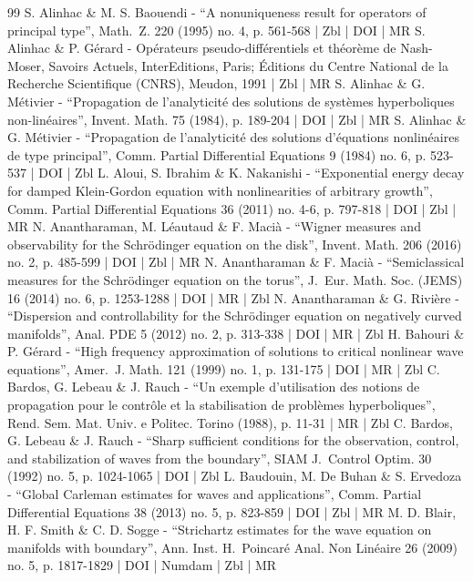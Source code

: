 \begin{thebibliography}{99}
S. Alinhac \& M. S. Baouendi - “A nonuniqueness result for operators of principal type”, Math. Z. 220 (1995) no. 4, p. 561-568 | Zbl | DOI | MR
S. Alinhac \& P. Gérard - Opérateurs pseudo-différentiels et théorème de Nash-Moser, Savoirs Actuels, InterEditions, Paris; Éditions du Centre National de la Recherche Scientifique (CNRS), Meudon, 1991 | Zbl | MR
S. Alinhac \& G. Métivier - “Propagation de l’analyticité des solutions de systèmes hyperboliques non-linéaires”, Invent. Math. 75 (1984), p. 189-204 | DOI | Zbl | MR
S. Alinhac \& G. Métivier - “Propagation de l’analyticité des solutions d’équations nonlinéaires de type principal”, Comm. Partial Differential Equations 9 (1984) no. 6, p. 523-537 | DOI | Zbl
L. Aloui, S. Ibrahim \& K. Nakanishi - “Exponential energy decay for damped Klein-Gordon equation with nonlinearities of arbitrary growth”, Comm. Partial Differential Equations 36 (2011) no. 4-6, p. 797-818 | DOI | Zbl | MR
N. Anantharaman, M. Léautaud \& F. Macià - “Wigner measures and observability for the Schrödinger equation on the disk”, Invent. Math. 206 (2016) no. 2, p. 485-599 | DOI | Zbl | MR
N. Anantharaman \& F. Macià - “Semiclassical measures for the Schrödinger equation on the torus”, J. Eur. Math. Soc. (JEMS) 16 (2014) no. 6, p. 1253-1288 | DOI | MR | Zbl
N. Anantharaman \& G. Rivière - “Dispersion and controllability for the Schrödinger equation on negatively curved manifolds”, Anal. PDE 5 (2012) no. 2, p. 313-338 | DOI | MR | Zbl
H. Bahouri \& P. Gérard - “High frequency approximation of solutions to critical nonlinear wave equations”, Amer. J. Math. 121 (1999) no. 1, p. 131-175 | DOI | MR | Zbl
C. Bardos, G. Lebeau \& J. Rauch - “Un exemple d’utilisation des notions de propagation pour le contrôle et la stabilisation de problèmes hyperboliques”, Rend. Sem. Mat. Univ. e Politec. Torino (1988), p. 11-31 | MR | Zbl
C. Bardos, G. Lebeau \& J. Rauch - “Sharp sufficient conditions for the observation, control, and stabilization of waves from the boundary”, SIAM J. Control Optim. 30 (1992) no. 5, p. 1024-1065 | DOI | Zbl
L. Baudouin, M. De Buhan \& S. Ervedoza - “Global Carleman estimates for waves and applications”, Comm. Partial Differential Equations 38 (2013) no. 5, p. 823-859 | DOI | Zbl | MR
M. D. Blair, H. F. Smith \& C. D. Sogge - “Strichartz estimates for the wave equation on manifolds with boundary”, Ann. Inst. H. Poincaré Anal. Non Linéaire 26 (2009) no. 5, p. 1817-1829 | DOI | Numdam | Zbl | MR

\end{thebibliography}
